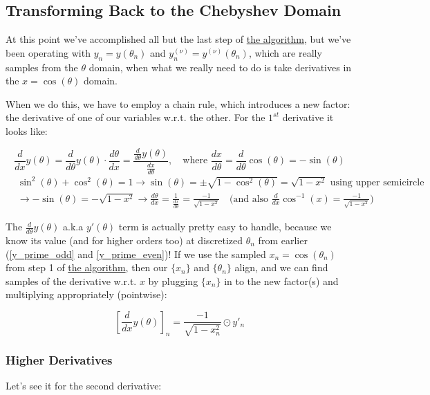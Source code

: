 \documentclass[10pt]{article}
\begin{document}
\subsection{Transforming Back to the Chebyshev Domain}

At this point we've accomplished all but the last step of \hyperref[algo]{the algorithm}, but we've been operating with $y_n = y(\theta_n)$ and $y_n^{(\nu)} = y^{(\nu)}(\theta_n)$, which are really samples from the $\theta$ domain, when what we really need to do is take derivatives in the $x = \cos(\theta)$ domain.

When we do this, we have to employ a chain rule, which introduces a new factor: the derivative of one of our variables w.r.t. the other. For the $1^{st}$ derivative it looks like:

$$\frac{d}{dx} y(\theta) = \frac{d}{d\theta} y(\theta) \cdot \frac{d\theta}{dx} = \frac{\frac{d}{d\theta} y(\theta)}{\frac{dx}{d\theta}}, \quad \text{where } \frac{dx}{d\theta} = \frac{d}{d\theta} \cos(\theta) = -\sin(\theta)$$
\begin{align*}
	& \sin^2(\theta) + \cos^2(\theta) = 1 \longrightarrow \sin(\theta) = \pm \sqrt{1-\cos^2(\theta)} = \sqrt{1 - x^2} \text{ using upper semicircle}\\
	& \longrightarrow -\sin(\theta) = -\sqrt{1 - x^2} \longrightarrow \frac{d\theta}{dx} = \frac{1}{\frac{dx}{d\theta}} = \frac{-1}{\sqrt{1 - x^2}} \quad \Big(\text{and also } \frac{d}{dx} \cos^{-1}(x) = \frac{-1}{\sqrt{1 - x^2}} \Big)
\end{align*}

The $\frac{d}{d\theta} y(\theta)$ a.k.a $y'(\theta)$ term is actually pretty easy to handle, because we know its value (and for higher orders too) at discretized $\theta_n$ from earlier (\autoref{y_prime_odd} and \autoref{y_prime_even})! If we use the sampled $x_n = \cos(\theta_n)$ from step 1 of \hyperref[algo]{the algorithm}, then our $\{x_n\}$ and $\{\theta_n\}$ align, and we can find samples of the derivative w.r.t. $x$ by plugging $\{x_n\}$ in to the new factor(s) and multiplying appropriately (pointwise):

$$[\frac{d}{dx} y(\theta)]_n = \frac{-1}{\sqrt{1 - x_n^2}} \odot y'_n$$

\subsubsection{Higher Derivatives}

Let's see it for the second derivative:
\end{document}
